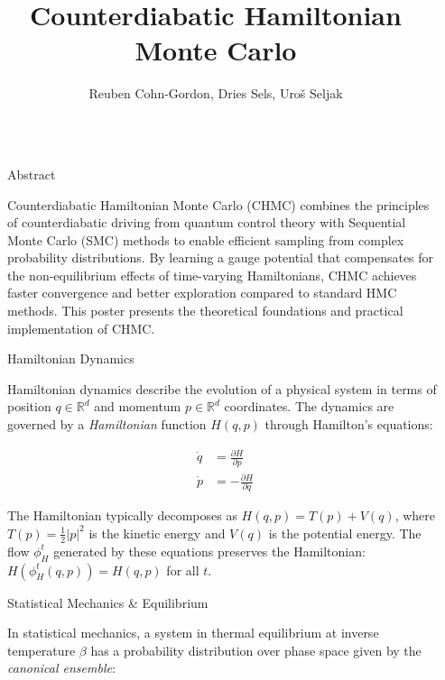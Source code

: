 \documentclass[final]{beamer}
\title{Counterdiabatic Hamiltonian Monte Carlo}
\author{Reuben Cohn-Gordon, Dries Sels, Uroš Seljak}
\newlength{\sepwidth}
\newlength{\colwidth}
\newcommand{\separatorcolumn}{\begin{column}{\sepwidth}\end{column}}
\begin{document}
\begin{frame}[t]
\begin{columns}[t]
\separatorcolumn

\begin{column}{\colwidth}

  \begin{block}{Abstract}
 
Counterdiabatic Hamiltonian Monte Carlo (CHMC) combines the principles of counterdiabatic driving from quantum control theory with Sequential Monte Carlo (SMC) methods to enable efficient sampling from complex probability distributions. By learning a gauge potential that compensates for the non-equilibrium effects of time-varying Hamiltonians, CHMC achieves faster convergence and better exploration compared to standard HMC methods. This poster presents the theoretical foundations and practical implementation of CHMC.

  \end{block}

  \begin{block}{Hamiltonian Dynamics}

Hamiltonian dynamics describe the evolution of a physical system in terms of position $q \in \mathbb{R}^d$ and momentum $p \in \mathbb{R}^d$ coordinates. The dynamics are governed by a \emph{Hamiltonian} function $H(q,p)$ through Hamilton's equations:

\begin{align}
\dot{q} &= \frac{\partial H}{\partial p} \\
\dot{p} &= -\frac{\partial H}{\partial q}
\end{align}

The Hamiltonian typically decomposes as $H(q,p) = T(p) + V(q)$, where $T(p) = \frac{1}{2}|p|^2$ is the kinetic energy and $V(q)$ is the potential energy. The flow $\phi_H^t$ generated by these equations preserves the Hamiltonian: $H(\phi_H^t(q,p)) = H(q,p)$ for all $t$.

\begin{center}
\end{center}

  \end{block}

  \begin{block}{Statistical Mechanics \& Equilibrium}

In statistical mechanics, a system in thermal equilibrium at inverse temperature $\beta$ has a probability distribution over phase space given by the \emph{canonical ensemble}:


\end{block}
\end{column}
\end{columns}
\end{frame}
\end{document}
